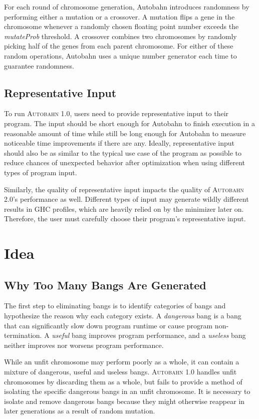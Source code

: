 \documentclass[format=sigplan]{acmart}
\newcommand{\unfit}[0]{unfit}
\newcommand{\dangerous}[0]{dangerous}
\newcommand{\useful}[0]{useful}
\newcommand{\useless}[0]{useless}
\newcommand{\Ao}[0]{\textsc{Autobahn 1.0}}
\newcommand{\At}[0]{\textsc{Autobahn 2.0}}
\begin{document}
For each round of chromosome generation, Autobahn introduces randomness by performing either a mutation or a crossover. A mutation flips a gene in the chromosome whenever a randomly chosen floating point number exceeds the \textit{mutateProb} threshold. A crossover combines two chromosomes by randomly picking half of the genes from each parent chromosome. For either of these random operations, Autobahn uses a unique number generator each time to guarantee randomness. 

\subsection{Representative Input}

To run \Ao{}, users need to provide representative input to their program. The input should be short enough for Autobahn to finish execution in a reasonable amount of time while still be long enough for Autobahn to measure noticeable time improvements if there are any. Ideally, representative input should also be as similar to the typical use case of the program as possible to reduce chances of unexpected behavior after optimization when using different types of program input.

Similarly, the quality of representative input impacts the quality of \At{}'s performance as well. Different types of input may generate wildly different results in GHC profiles, which are heavily relied on by the minimizer later on. Therefore, the user must carefully choose their program's representative input.

\section{Idea}
\subsection{Why Too Many Bangs Are Generated}

The first step to eliminating bangs is to identify categories of bangs and hypothesize the reason why each category exists. A \textit{\dangerous{}} bang is a bang that can significantly slow down program runtime or cause program non-termination. A \textit{\useful{}} bang improves program performance, and a \textit{\useless{}} bang neither improves nor worsens program performance. 

While an \unfit{} chromosome may perform poorly as a whole, it can contain a mixture of \dangerous, \useful{} and \useless{} bangs. \Ao{} handles \unfit{} chromosomes by discarding them as a whole, but fails to provide a method of isolating the specific \dangerous{} bangs in an \unfit{} chromosome. It is necessary to isolate and remove \dangerous{} bangs because they might otherwise reappear in later generations as a result of random mutation. 
\end{document}
